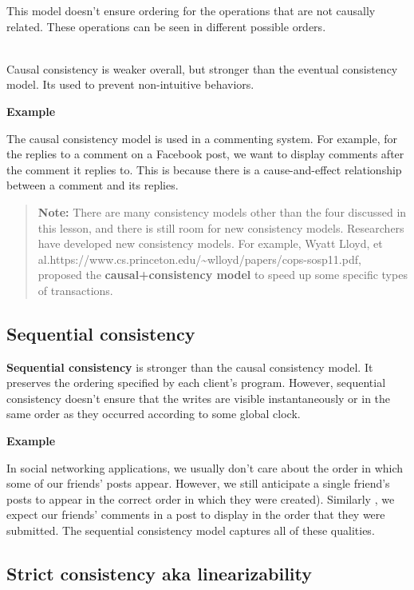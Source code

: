 This model doesn't ensure ordering for the operations that are not causally related. These operations can be seen in different possible orders.\\
\strut \\
Causal consistency is weaker overall, but stronger than the eventual consistency model. It\textquotesingle s used to prevent non-intuitive behaviors.

\textbf{Example}

The causal consistency model is used in a commenting system. For example, for the replies to a comment on a Facebook post, we want to display comments after the comment it replies to. This is because there is a cause-and-effect relationship between a comment and its replies.
\begin{quote}
\textbf{Note:} There are many consistency models other than the four discussed in this lesson, and there is still room for new consistency models. Researchers have developed new consistency models. For example, Wyatt Lloyd, et al.https://www.cs.princeton.edu/\textasciitilde wlloyd/papers/cops-sosp11.pdf, proposed the \textbf{causal+consistency model} to speed up some specific types of transactions.
\end{quote}
\subsection{Sequential consistency}\label{xmbdoC5EJ9RIC1jWdLPLr}

\textbf{Sequential consistency} is stronger than the causal consistency model. It preserves the ordering specified by each client's program. However, sequential consistency doesn't ensure that the writes are visible instantaneously or in the same order as they occurred according to some global clock.

\textbf{Example}

In social networking applications, we usually don't care about the order in which some of our friends' posts appear. However, we still anticipate a single friend's posts to appear in the correct order in which they were created). Similarly , we expect our friends' comments in a post to display in the order that they were submitted. The sequential consistency model captures all of these qualities.

\subsection{Strict consistency aka linearizability}\label{BxyoULAvqe1T4bW_jA9qz}

